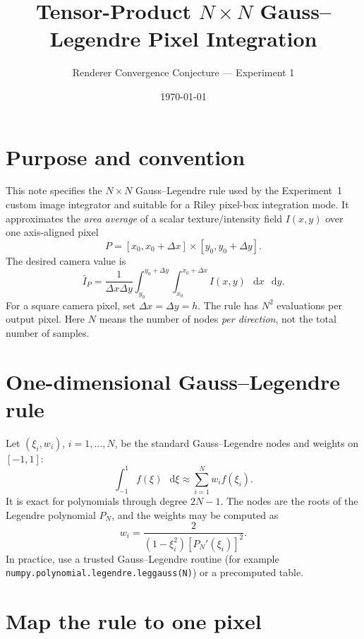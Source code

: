 \documentclass[11pt,a4paper]{article}
\title{Tensor-Product \(N\times N\) Gauss--Legendre Pixel Integration}
\author{Renderer Convergence Conjecture --- Experiment 1}
\date{\today}
\newcommand{\dd}{\mathop{}\!\mathrm{d}}
\begin{document}
\maketitle

\section{Purpose and convention}

This note specifies the \(N\times N\) Gauss--Legendre rule used by the
Experiment~1 custom image integrator and suitable for a Riley pixel-box
integration mode.  It approximates the \emph{area average} of a scalar
texture/intensity field \(I(x,y)\) over one axis-aligned pixel
\[
    P=[x_0,x_0+\Delta x]\times[y_0,y_0+\Delta y].
\]
The desired camera value is
\begin{equation}
    \bar I_P =
    \frac{1}{\Delta x\Delta y}
    \int_{y_0}^{y_0+\Delta y}\int_{x_0}^{x_0+\Delta x}
        I(x,y)\,\dd x\,\dd y.
    \label{eq:pixel-average}
\end{equation}
For a square camera pixel, set \(\Delta x=\Delta y=h\).  The rule has
\(N^2\) evaluations per output pixel.  Here \(N\) means the number of nodes
\emph{per direction}, not the total number of samples.

\section{One-dimensional Gauss--Legendre rule}

Let \((\xi_i,w_i)\), \(i=1,\ldots,N\), be the standard Gauss--Legendre nodes
and weights on \([-1,1]\):
\begin{equation}
    \int_{-1}^{1} f(\xi)\,\dd\xi
    \approx \sum_{i=1}^N w_i f(\xi_i).
    \label{eq:reference-rule}
\end{equation}
It is exact for polynomials through degree \(2N-1\).  The nodes are the roots
of the Legendre polynomial \(P_N\), and the weights may be computed as
\begin{equation}
    w_i =
    \frac{2}{(1-\xi_i^2)[P_N'(\xi_i)]^2}.
    \label{eq:reference-weights}
\end{equation}
In practice, use a trusted Gauss--Legendre routine (for example
\texttt{numpy.polynomial.legendre.leggauss(N)}) or a precomputed table.

\section{Map the rule to one pixel}
\end{document}
